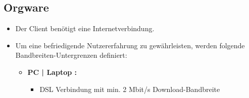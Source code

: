 	\subsection{Orgware}
	\begin{itemize}
		\item Der Client benötigt eine Internetverbindung.
		\item Um eine befriedigende Nutzererfahrung zu gewährleisten, werden folgende Bandbreiten-Untergrenzen definiert:
		\begin{itemize}
			\item \textbf{ PC | Laptop :}
			\begin{itemize}
				\item DSL Verbindung mit min. 2 Mbit/s Download-Bandbreite
			\end{itemize}
		\end{itemize}
	\end{itemize}	
